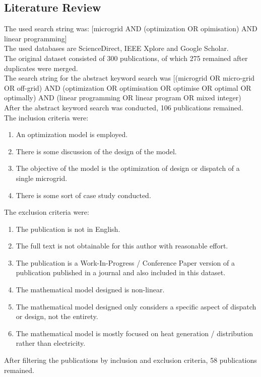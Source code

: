 \documentclass[
	11pt,								%
	DIV10,								%
	a4paper,         					%
	oneside,							%
	headheight=20pt,					%
	footheight=20pt,					%
    parskip=full,						%
    listof=totoc,						%
	bibliography=totoc,					%
	index=totoc,						%
]{scrartcl}
\begin{document}
\subsection{Literature Review}
The used search string was:  [microgrid AND (optimization OR opimisation) AND linear programming]
\\
The used databases are ScienceDirect, IEEE Xplore and Google Scholar.
\\
The original dataset consisted of 300 publications, of which 275 remained after duplicates were merged.
\\
The search string for the abstract keyword search was [(microgrid OR micro-grid OR off-grid) AND (optimization OR optimisation OR optimise OR optimal OR optimally) AND (linear programming OR linear program OR mixed integer)
\\
After the abstract keyword search was conducted, 106 publications remained.
\\
The inclusion criteria were:
\begin{enumerate}
	\item An optimization model is employed.
	\item There is some discussion of the design of the model.
	\item The objective of the model is the optimization of design or dispatch of a single microgrid.
	\item There is some sort of case study conducted.
\end{enumerate}
The exclusion criteria were:
\begin{enumerate}
	\item The publication is not in English.
	\item The full text is not obtainable for this author with reasonable effort.
	\item The publication is a Work-In-Progress / Conference Paper version of a publication published in a journal and also included in this dataset.
	\item The mathematical model designed is non-linear.
	\item The mathematical model designed only considers a specific aspect of dispatch or design, not the entirety.
	\item The mathematical model is mostly focused on heat generation / distribution rather than electricity.
\end{enumerate}
After filtering the publications by inclusion and exclusion criteria, 58 publications remained.


\newpage								%
\renewcommand\refname{Literature}			%
\printbibliography
\end{document}
